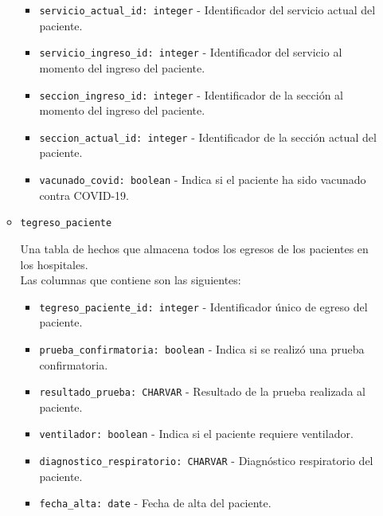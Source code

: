 \begin{itemize}
\begin{itemize}
\begin{itemize}
                \item \texttt{servicio\_actual\_id: integer} - Identificador del servicio actual del paciente.
                
                \item \texttt{servicio\_ingreso\_id: integer} - Identificador del servicio al momento del ingreso del paciente.
                
                \item \texttt{seccion\_ingreso\_id: integer} - Identificador de la sección al momento del ingreso del paciente.
                
                \item \texttt{seccion\_actual\_id: integer} - Identificador de la sección actual del paciente.
                
                \item \texttt{vacunado\_covid: boolean} - Indica si el paciente ha sido vacunado contra COVID-19.
            \end{itemize}
            
            \item \texttt{tegreso\_paciente}

            Una tabla de hechos que almacena todos los egresos de los pacientes en los hospitales.\\

            Las columnas que contiene son las siguientes:
            \begin{itemize}
                \item \texttt{tegreso\_paciente\_id: integer} - Identificador único de egreso del paciente.
                
                \item \texttt{prueba\_confirmatoria: boolean} - Indica si se realizó una prueba confirmatoria.
                
                \item \texttt{resultado\_prueba: CHARVAR} - Resultado de la prueba realizada al paciente.
                
                \item \texttt{ventilador: boolean} - Indica si el paciente requiere ventilador.
                
                \item \texttt{diagnostico\_respiratorio: CHARVAR} - Diagnóstico respiratorio del paciente.
                
                \item \texttt{fecha\_alta: date} - Fecha de alta del paciente.
                

\end{itemize}
\end{itemize}
\end{itemize}
